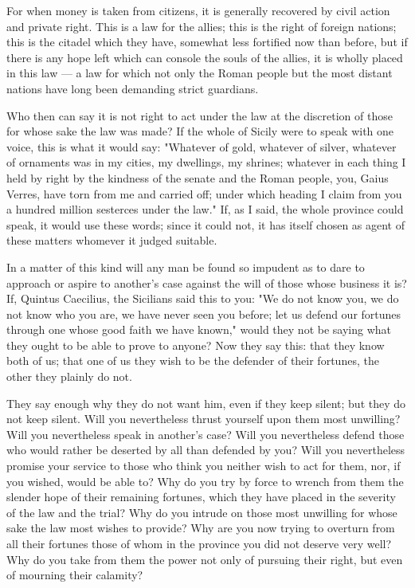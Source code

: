  For when money is taken from citizens, it is generally recovered by civil action and private right. This is a law for the allies; this is the right of foreign nations; this is the citadel which they have, somewhat less fortified now than before, but if there is any hope left which can console the souls of the allies, it is wholly placed in this law --- a law for which not only the Roman people but the most distant nations have long been demanding strict guardians.

 Who then can say it is not right to act under the law at the discretion of those for whose sake the law was made? If the whole of Sicily were to speak with one voice, this is what it would say: "Whatever of gold, whatever of silver, whatever of ornaments was in my cities, my dwellings, my shrines; whatever in each thing I held by right by the kindness of the senate and the Roman people, you, Gaius Verres, have torn from me and carried off; under which heading I claim from you a hundred million sesterces under the law." If, as I said, the whole province could speak, it would use these words; since it could not, it has itself chosen as agent of these matters whomever it judged suitable.

 In a matter of this kind will any man be found so impudent as to dare to approach or aspire to another's case against the will of those whose business it is? If, Quintus Caecilius, the Sicilians said this to you: "We do not know you, we do not know who you are, we have never seen you before; let us defend our fortunes through one whose good faith we have known," would they not be saying what they ought to be able to prove to anyone? Now they say this: that they know both of us; that one of us they wish to be the defender of their fortunes, the other they plainly do not.

 They say enough why they do not want him, even if they keep silent; but they do not keep silent. Will you nevertheless thrust yourself upon them most unwilling? Will you nevertheless speak in another's case? Will you nevertheless defend those who would rather be deserted by all than defended by you? Will you nevertheless promise your service to those who think you neither wish to act for them, nor, if you wished, would be able to? Why do you try by force to wrench from them the slender hope of their remaining fortunes, which they have placed in the severity of the law and the trial? Why do you intrude on those most unwilling for whose sake the law most wishes to provide? Why are you now trying to overturn from all their fortunes those of whom in the province you did not deserve very well? Why do you take from them the power not only of pursuing their right, but even of mourning their calamity?

